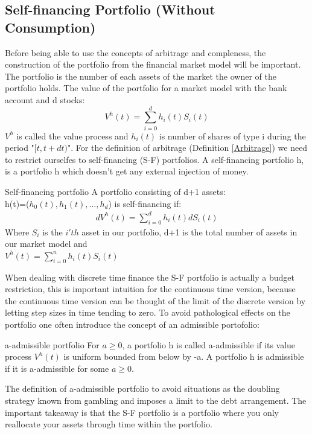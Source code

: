 \subsection{Self-financing Portfolio (Without Consumption)}
Before being able to use the concepts of arbitrage and compleness, the construction of the portfolio from the financial market model will be important. The portfolio is the number of each assets of the market the owner of the portfolio holds. The value of the portfolio for a market model with the bank account and d stocks:
\begin{equation}
V^h(t)=\sum_{i=0}^{d} h_{i}(t) S_i(t)
\end{equation}
$V^h$ is called the value process and $h_i(t)$ is number of shares of type i during the period "$[t,t+dt)$". For the definition of arbitrage (Definition \ref{Arbitrage}) we need to restrict ourselfes to self-financing (S-F) portfolios. A self-financing portfolio h, is a portfolio h which doesn't get any external injection of money.
\theoremstyle{definition}
\begin{definition}{Self-financing portfolio}
A portfolio consisting of d+1 assets: \\
h(t)=($h_0(t),h_1(t), \dotsc, h_{d}$) is self-financing if:
\begin{equation}\label{SF}
\begin{split}
dV^{h}(t)=\sum_{i=0}^{d} h_{i}(t) dS_{i}(t)
\end{split}
\end{equation}
Where $S_{i}$ is the $i'th$ asset in our portfolio, d+1 is the total number of assets in our market model and\\
$V^{h}(t)=\sum_{i=0}^{n} h_{i}(t) S_{i}(t)$\\
\end{definition}
When dealing with discrete time finance the S-F portfolio is actually a budget restriction, this is important intuition for the continuous time version, because the continuous time version can be thought of the limit of the discrete version by letting step sizes in time tending to zero. To avoid pathological effects on the portfolio one often introduce the concept of an admissible portofolio:
\theoremstyle{definition}
\begin{definition}{a-admissible portfolio}
For $a\geq 0$, a portfolio h is called a-admissible if its value process $V^h(t)$ is uniform bounded from below by -a. A portfolio h is admissible if it is a-admissible for some $a\geq 0$.
\end{definition}
The definition of a-admissible portfolio to avoid situations as the doubling strategy known from gambling and imposes a limit to the debt arrangement. The important takeaway is that the S-F portfolio is a portfolio where you only reallocate your assets through time within the portfolio.

